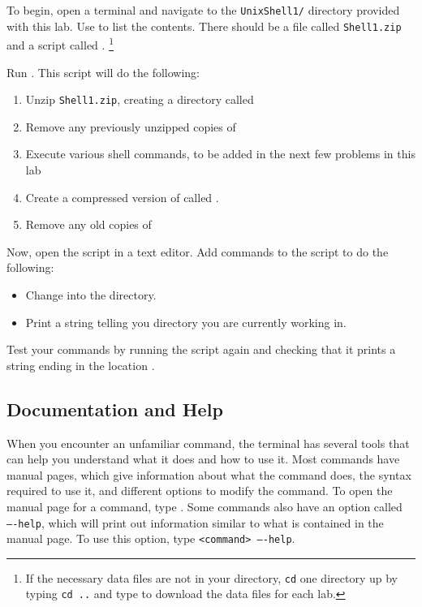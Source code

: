 \begin{problem}
To begin, open a terminal and navigate to the \texttt{UnixShell1/} directory provided with this lab.
Use  to list the contents. 
There should be a file called \texttt{Shell1.zip} and a script called .
\footnote{If the necessary data files are not in your directory, \texttt{cd} one directory up by typing \texttt{cd ..} and type \footnotesize{} to download the data files for each lab.}
 
Run .
This script will do the following:
\begin{enumerate}
	\item Unzip \texttt{Shell1.zip}, creating a directory called 
	\item Remove any previously unzipped copies of 
	\item Execute various shell commands, to be added in the next few problems in this lab
	\item Create a compressed version of  called .
	\item Remove any old copies of 
\end{enumerate}

Now, open the  script in a text editor.
Add commands to the script to do the following:
\begin{itemize}
	\item Change into the  directory.
	\item Print a string telling you directory you are currently working in.
\end{itemize}
	
Test your commands by running the script again and checking that it prints a string ending in the location .
\label{problem:basic-commands}
\end{problem}

\subsection*{Documentation and Help} %
When you encounter an unfamiliar command, the terminal has several tools that can help you understand what it does and how to use it.
Most commands have manual pages, which give information about what the command does, the syntax required to use it, and different options to modify the command.
To open the manual page for a command, type .
Some commands also have an option called \texttt{----help}, which will print out information similar to what is contained in the manual page.
To use this option, type \texttt{<command> ----help}.

